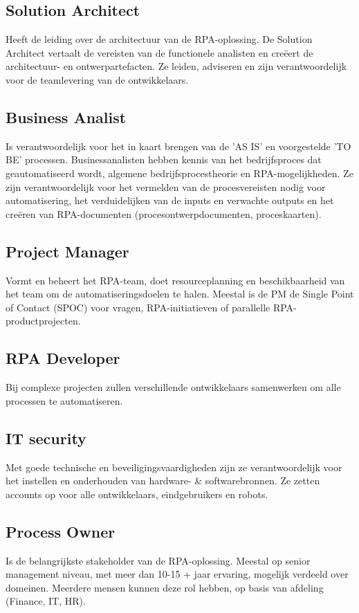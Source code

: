 \subsection{Solution Architect}
Heeft de leiding over de architectuur van de RPA-oplossing. De Solution Architect vertaalt de vereisten van de functionele analisten en creëert de architectuur- en ontwerpartefacten. Ze leiden, adviseren en zijn verantwoordelijk voor de teamlevering van de ontwikkelaars.

\subsection{Business Analist}
Is verantwoordelijk voor het in kaart brengen van de 'AS IS' en voorgestelde 'TO BE' processen. Businessanalisten hebben kennis van het bedrijfsproces dat geautomatiseerd wordt, algemene bedrijfsprocestheorie en RPA-mogelijkheden. Ze zijn verantwoordelijk voor het vermelden van de procesvereisten nodig voor automatisering, het verduidelijken van de inputs en verwachte outputs en het creëren van RPA-documenten (procesontwerpdocumenten, proceskaarten).

\subsection{Project Manager}
Vormt en beheert het RPA-team, doet resourceplanning en beschikbaarheid van het team om de automatiseringsdoelen te halen. Meestal is de PM de Single Point of Contact (SPOC) voor vragen, RPA-initiatieven of parallelle RPA-productprojecten.

\subsection{RPA Developer}
Bij complexe projecten zullen verschillende ontwikkelaars samenwerken om alle processen te automatiseren.

\subsection{IT security}
Met goede technische en beveiligingsvaardigheden zijn ze verantwoordelijk voor het instellen en onderhouden van hardware- \& softwarebronnen. Ze zetten accounts op voor alle ontwikkelaars, eindgebruikers en robots.

\subsection{Process Owner}
Is de belangrijkste stakeholder van de RPA-oplossing. Meestal op senior management niveau, met meer dan 10-15 + jaar ervaring, mogelijk verdeeld over domeinen. Meerdere mensen kunnen deze rol hebben, op basis van afdeling (Finance, IT, HR).

